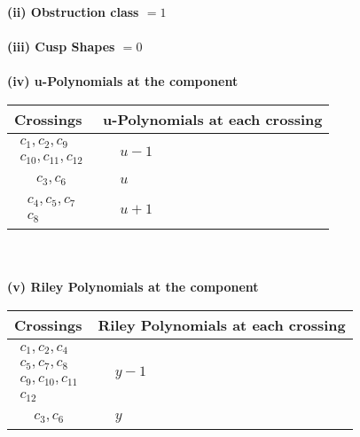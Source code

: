 \documentclass[1p]{elsarticle_modified}
\theoremstyle{definition}
\begin{document}
\flushleft \textbf{(ii) Obstruction class $= 1$}\\~\\
\flushleft \textbf{(iii) Cusp Shapes $= 0$}\\~\\
\newpage\renewcommand{\arraystretch}{1}
\flushleft \textbf{(iv) u-Polynomials at the component}\newline \\
\begin{tabular}{m{50pt}|m{274pt}}
Crossings & \hspace{64pt}u-Polynomials at each crossing \\
\hline $$\begin{aligned}c_{1},c_{2},c_{9}\\c_{10},c_{11},c_{12}\end{aligned}$$&$\begin{aligned}
&u-1
\end{aligned}$\\
\hline $$\begin{aligned}c_{3},c_{6}\end{aligned}$$&$\begin{aligned}
&u
\end{aligned}$\\
\hline $$\begin{aligned}c_{4},c_{5},c_{7}\\c_{8}\end{aligned}$$&$\begin{aligned}
&u+1
\end{aligned}$\\
\hline
\end{tabular}\\~\\
\newpage\renewcommand{\arraystretch}{1}
\flushleft \textbf{(v) Riley Polynomials at the component}\newline \\
\begin{tabular}{m{50pt}|m{274pt}}
Crossings & \hspace{64pt}Riley Polynomials at each crossing \\
\hline $$\begin{aligned}c_{1},c_{2},c_{4}\\c_{5},c_{7},c_{8}\\c_{9},c_{10},c_{11}\\c_{12}\end{aligned}$$&$\begin{aligned}
&y-1
\end{aligned}$\\
\hline $$\begin{aligned}c_{3},c_{6}\end{aligned}$$&$\begin{aligned}
&y
\end{aligned}$\\
\hline
\end{tabular}\\~\\
\end{document}
